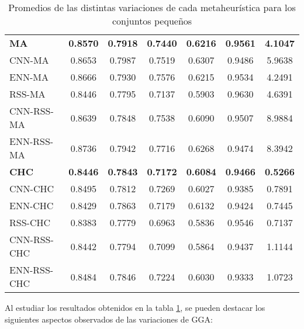 \begin{table}[h!]
\begin{tabular}{l c c c c c c}
\hline

\textbf{MA}   & \textbf{0.8570} & \textbf{0.7918} & \textbf{0.7440} & \textbf{0.6216} & \textbf{0.9561} & \textbf{4.1047} \\
CNN-MA & 0.8653 & 0.7987 & 0.7519 & 0.6307 & 0.9486 & 5.9638 \\
ENN-MA & 0.8666 & 0.7930 & 0.7576 & 0.6215 & 0.9534 & 4.2491 \\
RSS-MA & 0.8446 & 0.7795 & 0.7137 & 0.5903 & 0.9630 & 4.6391 \\
CNN-RSS-MA  & 0.8639 & 0.7848 & 0.7538 & 0.6090 & 0.9507 & 8.9884 \\
ENN-RSS-MA & 0.8736 & 0.7942 & 0.7716 & 0.6268 & 0.9474 & 8.3942 \\

\hline

\textbf{CHC} & \textbf{0.8446} & \textbf{0.7843} & \textbf{0.7172} & \textbf{0.6084} & \textbf{0.9466} & \textbf{0.5266} \\
CNN-CHC & 0.8495 & 0.7812 & 0.7269 & 0.6027 & 0.9385 & 0.7891 \\
ENN-CHC & 0.8429 & 0.7863 & 0.7179 & 0.6132 & 0.9424 & 0.7445 \\
RSS-CHC & 0.8383 & 0.7779 & 0.6963 & 0.5836 & 0.9546 & 0.7137 \\
CNN-RSS-CHC  & 0.8442 & 0.7794 & 0.7099 & 0.5864 & 0.9437 & 1.1144 \\
ENN-RSS-CHC & 0.8484 & 0.7846 & 0.7224 & 0.6030 & 0.9333 & 1.0723 \\

\hline
\end{tabular}
\caption{Promedios de las distintas variaciones de cada metaheurística para los conjuntos pequeños}
\label{peq-all}
\end{table}

Al estudiar los resultados obtenidos en la tabla \ref{peq-all}, se pueden destacar los siguientes aspectos observados de las variaciones de GGA:

